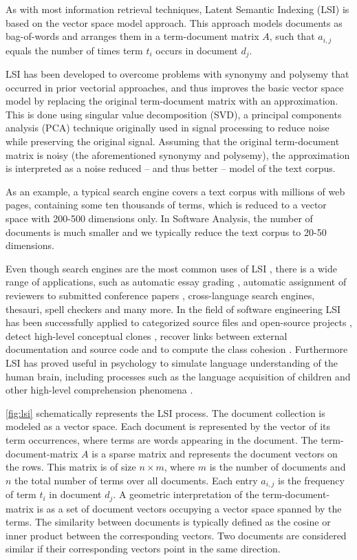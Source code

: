\documentclass[10pt]{book}
\begin{document}
As with most information retrieval techniques, Latent Semantic Indexing (LSI) is based on the vector space model approach. This approach models documents as bag-of-words and arranges them in a term-document matrix $A$, such that $a_{i,j}$ equals the number of times term $t_i$ occurs in document $d_j$.

LSI has been developed to overcome problems with synonymy and polysemy that occurred in prior vectorial approaches, and thus improves the basic vector space model by replacing the original term-document matrix with an approximation. This is done using singular value decomposition (SVD), a principal components analysis (PCA) technique originally used in signal processing to reduce noise while preserving the original signal. Assuming that the original term-document matrix is noisy (the aforementioned synonymy and polysemy), the approximation is interpreted as a noise reduced -- and thus better -- model of the text corpus.

As an example, a typical search engine covers a text corpus with millions of web pages, containing some ten thousands of terms, which is reduced to a vector space with 200-500 dimensions only. In Software Analysis, the number of documents is much smaller and we typically reduce the text corpus to 20-50 dimensions.

Even though search engines are the most common uses of LSI \cite{Berr94a}, there is a wide range of applications, such as automatic essay grading \cite{Folt99a}, automatic assignment of reviewers to submitted conference papers \cite{Duma92a},  cross-language search engines, thesauri, spell checkers and many more.
In the field of software engineering LSI has been successfully applied to categorized source files \cite{Male00a} and open-source projects \cite{Kawa04a}, detect high-level conceptual clones \cite{Marc01a}, recover links between external documentation and source code \cite{Luci04a,Marc05a} and to compute the class cohesion \cite{Marc05a}. Furthermore LSI has proved useful in psychology to simulate language understanding of the human brain, including processes such as the language acquisition of children and other high-level comprehension phenomena \cite{Land97a}.

\autoref{fig:lsi} schematically represents the LSI process. The document collection is modeled as a vector space. Each document is represented by the vector of its term occurrences, where terms are words appearing in the document. The term-document-matrix $A$ is a sparse matrix and represents the document vectors on the rows. This matrix is of size $n \times m$, where $m$ is the number of documents and $n$ the total number of terms over all documents. Each entry $a_{i,j}$ is the frequency of term $t_i$ in document $d_j$. A geometric interpretation of the term-document-matrix is as a set of document vectors occupying a vector space spanned by the terms. The similarity between documents is typically defined as the cosine or inner product between the corresponding vectors. Two documents are considered similar if their corresponding vectors point in the same direction.
\end{document}
